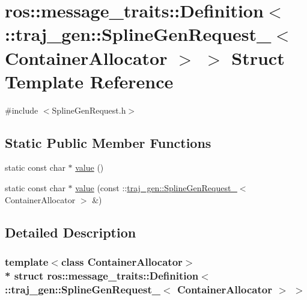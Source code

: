 \hypertarget{structros_1_1message__traits_1_1_definition_3_01_1_1traj__gen_1_1_spline_gen_request___3_01_container_allocator_01_4_01_4}{}\section{ros\+:\+:message\+\_\+traits\+:\+:Definition$<$ \+:\+:traj\+\_\+gen\+:\+:Spline\+Gen\+Request\+\_\+$<$ Container\+Allocator $>$ $>$ Struct Template Reference}
\label{structros_1_1message__traits_1_1_definition_3_01_1_1traj__gen_1_1_spline_gen_request___3_01_container_allocator_01_4_01_4}


{\ttfamily \#include $<$Spline\+Gen\+Request.\+h$>$}

\subsection*{Static Public Member Functions}
\begin{DoxyCompactItemize}
\item 
static const char $\ast$ \hyperlink{structros_1_1message__traits_1_1_definition_3_01_1_1traj__gen_1_1_spline_gen_request___3_01_container_allocator_01_4_01_4_a1c0e191fa6bd9645ab45f658864584d9}{value} ()
\item 
static const char $\ast$ \hyperlink{structros_1_1message__traits_1_1_definition_3_01_1_1traj__gen_1_1_spline_gen_request___3_01_container_allocator_01_4_01_4_a165a0952728f34e75639a65df1f2f57c}{value} (const \+::\hyperlink{structtraj__gen_1_1_spline_gen_request__}{traj\+\_\+gen\+::\+Spline\+Gen\+Request\+\_\+}$<$ Container\+Allocator $>$ \&)
\end{DoxyCompactItemize}


\subsection{Detailed Description}
\subsubsection*{template$<$class Container\+Allocator$>$\\*
struct ros\+::message\+\_\+traits\+::\+Definition$<$ \+::traj\+\_\+gen\+::\+Spline\+Gen\+Request\+\_\+$<$ Container\+Allocator $>$ $>$}



